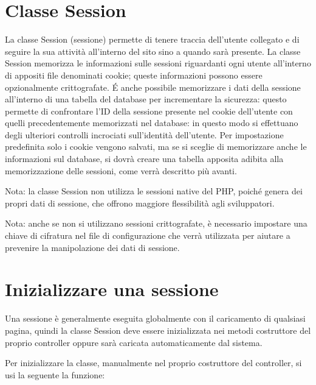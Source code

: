 \section{Classe Session}
\label{class:sessione}

La classe Session (sessione) permette di tenere traccia dell'utente collegato e di seguire la sua attività all'interno del sito sino a quando sarà presente. La classe Session memorizza le informazioni sulle sessioni riguardanti ogni utente all'interno di appositi file denominati cookie; queste informazioni possono essere opzionalmente crittografate. \'E anche possibile memorizzare i dati della sessione all'interno di una tabella del database per incrementare la sicurezza: questo permette di confrontare l'ID della sessione presente nel cookie dell'utente con quelli precedentemente memorizzati nel database: in questo modo si effettuano degli ulteriori controlli incrociati sull'identità dell'utente. Per impostazione predefinita solo i cookie vengono salvati, ma se si sceglie di memorizzare anche le informazioni sul database, si dovrà creare una tabella apposita adibita alla memorizzazione delle sessioni, come verrà descritto più avanti.

Nota: la classe Session non utilizza le sessioni native del \ac{PHP}, poiché genera dei propri dati di sessione, che offrono maggiore flessibilità agli sviluppatori.

Nota: anche se non si utilizzano sessioni crittografate, è necessario impostare una chiave di cifratura nel file di configurazione che verrà utilizzata per aiutare a prevenire la manipolazione dei dati di sessione.

\section*{Inizializzare una sessione}

Una sessione è generalmente eseguita globalmente con il caricamento di qualsiasi pagina, quindi la classe Session deve essere inizializzata nei metodi costruttore del proprio controller oppure sarà caricata automaticamente dal sistema. 

Per inizializzare la classe, manualmente nel proprio costruttore del controller, si usi la seguente la funzione: 


